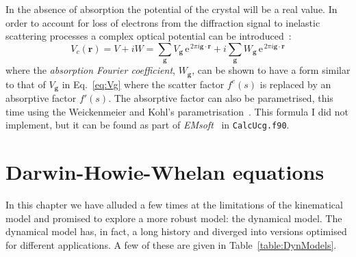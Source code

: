 In the absence of absorption the potential of the crystal will be a real value. In order to account for loss of electrons from the diffraction signal to inelastic scattering processes a complex optical potential can be introduced~\cite{Gevers66}:
\begin{equation}
\label{eq:Vc}
V_c(\mathbf{r}) = V + i W = \sum_{\mathbf{g}} V_{\mathbf{g}} \, \mathrm{e}^{\, 2\pi i \mathbf{g}\cdot \mathbf{r}} + i \sum_{\mathbf{g}}W_{\mathbf{g}} \, \mathrm{e}^{\, 2\pi i \mathbf{g}\cdot \mathbf{r}}
\end{equation}
where the \textit{absorption Fourier coefficient}, $W_\mathbf{g}$, can be shown to have a form similar to that of $V_\mathbf{g}$ in Eq.~\ref{eq:Vg} where the scatter factor $f^e(s)$ is replaced by an absorptive factor $f'(s)$. The absorptive factor can also be parametrised,  this time using the Weickenmeier and Kohl's parametrisation~\cite{Weickenmeier91}. This formula I did not implement, but it can be found as part of \textit{EMsoft}~\cite{EMsoft} in \texttt{CalcUcg.f90}. 



\pagebreak



\section{Darwin-Howie-Whelan equations}
\label{sec:DHW}
In this chapter we have alluded a few times at the limitations of the kinematical model and promised to explore a more robust model: the dynamical model. The dynamical model has, in fact, a long history and diverged into versions optimised for different applications. A few of these are given in Table~\ref{table:DynModels}.

